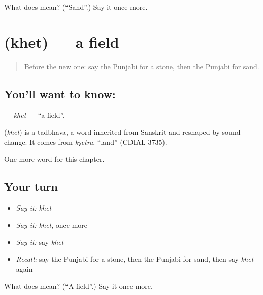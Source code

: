 \begin{tcolorbox}[breakable,colback=teal!4,colframe=teal!35!black,title={Before you move on}]
What does  mean? (\textquotedblleft{}Sand\textquotedblright{}.) Say it once more.
\end{tcolorbox}
\section[\texorpdfstring{\pa{ਖੇਤ} (khet)}{ਖੇਤ (khet)}]{ (khet) — a field}

\label{lesson:PA-C75-khet}



\begin{quote}
Before the new one: say the Punjabi for a stone, then the Punjabi for sand.
\end{quote}

\subsection*{You'll want to know: }
\textbf{} — \emph{khet} — \textquotedblleft{}a field\textquotedblright{}.

\begin{cousinweb}
\textbf{} (\emph{khet}) is a tadbhava, a word inherited from Sanskrit and reshaped by sound change. It comes from \emph{kṣetra}, \textquotedblleft{}land\textquotedblright{} (CDIAL 3735).
\end{cousinweb}

\begin{grammarlens}[title={What you've built}]
One more word for this chapter.
\end{grammarlens}

\subsection*{Your turn}
\begin{itemize}
\raggedright
  \item \emph{Say it:} \emph{khet}
  \item \emph{Say it:} \emph{khet}, once more
  \item \emph{Say it:} say \emph{khet}
  \item \emph{Recall:} say the Punjabi for a stone, then the Punjabi for sand, then say \emph{khet} again
\end{itemize}

\begin{tcolorbox}[breakable,colback=teal!4,colframe=teal!35!black,title={Before you move on}]
What does  mean? (\textquotedblleft{}A field\textquotedblright{}.) Say it once more.
\end{tcolorbox}
